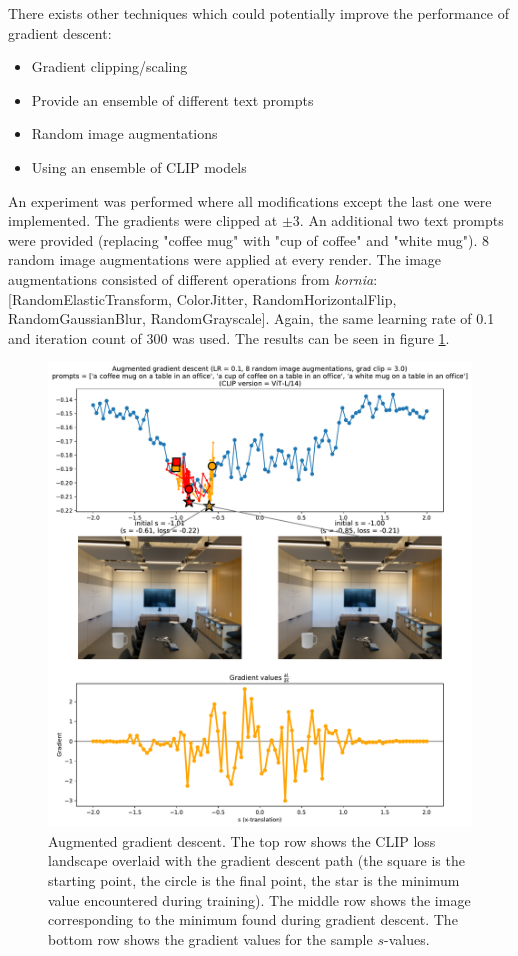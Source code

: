There exists other techniques which could potentially improve the performance of gradient descent: \noindent
\begin{itemize}[noitemsep]
    \setlength\itemsep{0.5em}
    \item Gradient clipping/scaling
    \item Provide an ensemble of different text prompts
    \item Random image augmentations
    \item Using an ensemble of CLIP models
\end{itemize}
An experiment was performed where all modifications except the last one were implemented. The gradients were clipped at $\pm3$. An additional two text prompts were provided (replacing "coffee mug" with "cup of coffee" and "white mug"). 8 random image augmentations were applied at every render. The image augmentations consisted of different operations from \textit{kornia}: [RandomElasticTransform, ColorJitter, RandomHorizontalFlip, RandomGaussianBlur, RandomGrayscale]. Again, the same learning rate of 0.1 and iteration count of 300 was used. The results can be seen in figure \ref{fig:3_2-room-megaaugment-gd}.

\begin{figure}[H]
    \centering
    \includegraphics[width=1.0\textwidth]{figures/3_2-room-megaaugment-gd.pdf}
    \caption{Augmented gradient descent. The top row shows the CLIP loss landscape overlaid with the gradient descent path (the square is the starting point, the circle is the final point, the star is the minimum value encountered during training). The middle row shows the image corresponding to the minimum found during gradient descent. The bottom row shows the gradient values for the sample $s$-values.}
    \label{fig:3_2-room-megaaugment-gd}
\end{figure}

